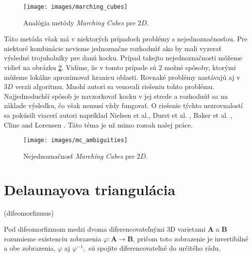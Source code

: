 \begin{figure}
    \centerline{\texttt{[image: images/marching\_cubes]}}
    \caption[Analógia metódy \textit{Marching Cubes}]{Analógia metódy \textit{Marching Cubes} pre $2D$.}
    \label{obr:marching_cubes}
\end{figure}

Táto metóda však má v niektorých prípadoch problémy s nejednoznačnosťou. Pre niektoré kombinácie
nevieme jednoznačne rozhodnúť ako by mali vyzerať výsledné trojuholníky pre danú kocku. Prípad takejto
nejednoznačnosti môžeme vidieť na obrázku \ref{obr:mc_ambiguities}. Vidíme, že v tomto prípade sú $2$ 
možné spôsoby, ktorými môžeme lokálne aproximovať hranicu oblasti. Rovnaké problémy nastávajú aj v $3D$
verzii algoritmu. Mnohí autori sa venovali riešeniu tohto problému. Najjednoduchší spôsob je navzorkovať
kocku v jej strede a rozhodnúť sa na základe výsledku, čo však nemusí vždy fungovať. O riešenie týchto 
nezrovnalostí sa pokúsili viacerí autori napríklad Nielsen et al.\cite{nielson1991asymptotic},
Durst et al. \cite{durst1988re}, Baker et al. \cite{baker1989building},
Cline and Lorensen \cite{cline1988two}. Táto téma je už mimo rozsah našej práce.

\begin{figure}
    \centerline{\texttt{[image: images/mc\_ambiguities]}}
    \caption[Nejednoznačnosť \textit{Marching Cubes}]{Nejednoznačnosť \textit{Marching Cubes} pre $2D$.}
    \label{obr:mc_ambiguities}
\end{figure}



\section{Delaunayova triangulácia}
\label{kap:delaunay_triangulation}

\begin{definition}
    (difeomorfizmus)

    Pod difeomorfizmom medzi dvoma diferencovateľnými 3D varietami $\mathbf{A}$ a $\mathbf{B}$ 
    rozumieme existenciu zobrazenia $\varphi : \mathbf{A} \to \mathbf{B}$, pričom toto zobrazenie 
    je invertibilné a obe zobrazenia, $\varphi$ aj $\varphi^{-1},$ sú spojite diferencovateľné do určitého rádu. 
\end{definition}


